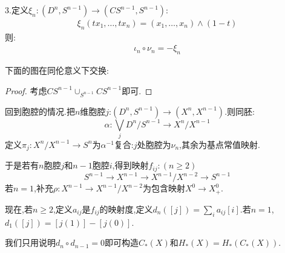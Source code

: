 3.定义$\xi_n:(D^n,S^{n-1})\rightarrow (CS^{n-1},S^{n-1})$:
\begin{align*}
    \xi_n(tx_1,\dots,tx_n)=(x_1,\dots,x_n)\wedge (1-t)
\end{align*}
则:
\begin{align*}
    \iota_n \circ \nu_n=-\xi_n
\end{align*}
\begin{lemma}
    下面的图在同伦意义下交换:
\end{lemma}
\begin{proof}
    考虑$CS^{n-1} \cup_{S^{n-1}}CS^{n-1}$即可.
\end{proof}
回到胞腔的情况.把$n$维胞腔$j$:$(D^n,S^{n-1})\to (X^n,X^{n-1})$.则同胚:
$$
\alpha:\bigvee_j D^n/S^{n-1}\to X^n/X^{n-1}
$$
定义$\pi_j:X^n/X^{n-1} \to S^n$为$\alpha^{-1}$复合:$j$处胞腔为$\nu_n$,其余为基点常值映射.

于是若有$n$胞腔$j$和$n-1$胞腔$i$,得到映射$f_{ij}:(n\geq 2)$
$$
S^{n-1} \to X^{n-1} \to X^{n-1}/X^{n-2} \to S^{n-1}
$$
若$n=1$,补充$\rho:X^{n-1}\to X^{n-1}/X^{n-2}$为包含映射$X^0 \to X^0_{+}$.

现在,若$n\geq 2$,定义$a_{ij}$是$f_{ij}$的映射度,定义$d_n([j])=\sum_i a_{ij}[i]$.若$n=1$,$d_1([j])=[j(1)]-[j(0)]$.

我们只用说明$d_n \circ d_{n-1}=0$即可构造$C_*(X)$和$H_*(X)=H_*(C_*(X))$.
